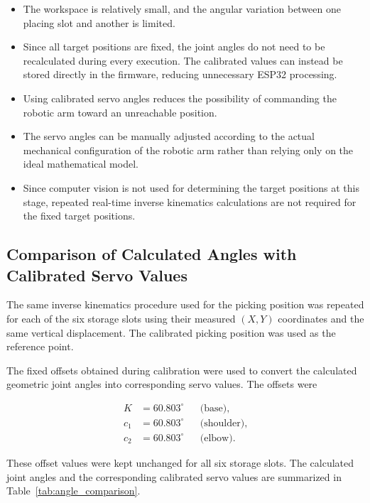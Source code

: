 \begin{itemize}
    \item The workspace is relatively small, and the angular variation between one placing slot and another is limited.
    
    \item Since all target positions are fixed, the joint angles do not need to be recalculated during every execution. The calibrated values can instead be stored directly in the firmware, reducing unnecessary ESP32 processing.
    
    \item Using calibrated servo angles reduces the possibility of commanding the robotic arm toward an unreachable position.
    
    \item The servo angles can be manually adjusted according to the actual mechanical configuration of the robotic arm rather than relying only on the ideal mathematical model.
    
    \item Since computer vision is not used for determining the target positions at this stage, repeated real-time inverse kinematics calculations are not required for the fixed target positions.
\end{itemize}

\subsection{Comparison of Calculated Angles with Calibrated Servo Values}

The same inverse kinematics procedure used for the picking position was repeated for each of the six storage slots using their measured $(X,Y)$ coordinates and the same vertical displacement. The calibrated picking position was used as the reference point.

The fixed offsets obtained during calibration were used to convert the calculated geometric joint angles into corresponding servo values. The offsets were

\begin{align}
K &= 60.803^\circ && \text{(base)},\\
c_1 &= 60.803^\circ && \text{(shoulder)},\\
c_2 &= 60.803^\circ && \text{(elbow)}.
\end{align}

These offset values were kept unchanged for all six storage slots. The calculated joint angles and the corresponding calibrated servo values are summarized in Table~\ref{tab:angle_comparison}.

